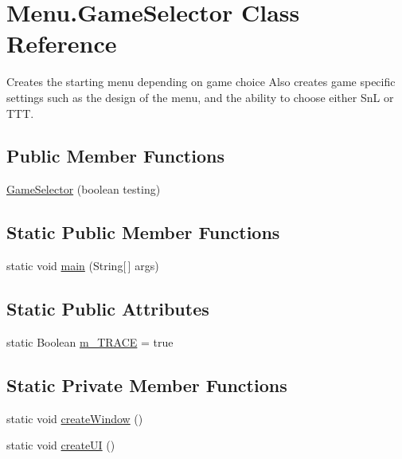 \hypertarget{class_menu_1_1_game_selector}{}\section{Menu.\+Game\+Selector Class Reference}
\label{class_menu_1_1_game_selector}


Creates the starting menu depending on game choice Also creates game specific settings such as the design of the menu, and the ability to choose either Sn\+L or T\+T\+T.  


\subsection*{Public Member Functions}
\begin{DoxyCompactItemize}
\item 
\hyperlink{class_menu_1_1_game_selector_adbafa9df1cdafc14b39cb120c6ee649a}{Game\+Selector} (boolean testing)
\end{DoxyCompactItemize}
\subsection*{Static Public Member Functions}
\begin{DoxyCompactItemize}
\item 
static void \hyperlink{class_menu_1_1_game_selector_acc61bbafb5fd894b403d5e0826ef2030}{main} (String\mbox{[}$\,$\mbox{]} args)
\end{DoxyCompactItemize}
\subsection*{Static Public Attributes}
\begin{DoxyCompactItemize}
\item 
static Boolean \hyperlink{class_menu_1_1_game_selector_a2eb9bf5de7be21be696db9228f4bff0f}{m\+\_\+\+T\+R\+A\+C\+E} = true
\end{DoxyCompactItemize}
\subsection*{Static Private Member Functions}
\begin{DoxyCompactItemize}
\item 
static void \hyperlink{class_menu_1_1_game_selector_a657e217de86042e8190a28fdde3eac9d}{create\+Window} ()
\item 
static void \hyperlink{class_menu_1_1_game_selector_afabfb42f9fedc64129e47d68ef0f7b4d}{create\+U\+I} ()
\end{DoxyCompactItemize}

